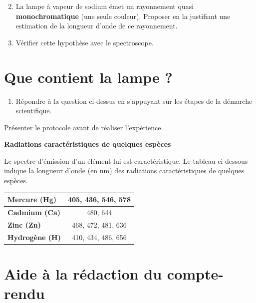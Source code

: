 \documentclass[12pt,a4paper,fleqn]{article}
\begin{document}
\begin{enumerate}
\setcounter{enumi}{1}
\item \app{} \anarai{}

La lampe à vapeur de sodium émet un rayonnement quasi \textbf{monochromatique} (une seule couleur).
Proposer en la justifiant une estimation de la longueur d'onde de ce rayonnement.

\item \rea{} \val{}

Vérifier cette hypothèse avec le spectroscope.
\end{enumerate}

\section*{Que contient la lampe ?}

\begin{enumerate}[resume]
\item \app{} \anarai{} \rea{} \val{} \com{}

Répondre à la question ci-dessus en s'appuyant sur les étapes de la démarche scientifique. 
\end{enumerate}

\begin{appel}
Présenter le protocole avant de réaliser l'expérience.
\end{appel}

\begin{doc}
\textbf{Radiations caractéristiques de quelques espèces}

Le spectre d'émission d'un élément lui est caractéristique.
Le tableau ci-dessous indique la longueur d'onde (en nm) des radiations caractéristiques de quelques espèces.
\begin{center}
\begin{tabular}{|l|c|}
\hline
\textbf{Mercure (Hg)} & 405, 436, 546, 578 \\
\hline
\textbf{Cadmium (Ca)} & 480, 644 \\
\hline
\textbf{Zinc (Zn)} & 468, 472, 481, 636 \\
\hline
\textbf{Hydrogène (H)} & 410, 434, 486, 656 \\
\hline
\end{tabular}
\end{center}
\end{doc}

\section*{Aide à la rédaction du compte-rendu}
\end{document}
